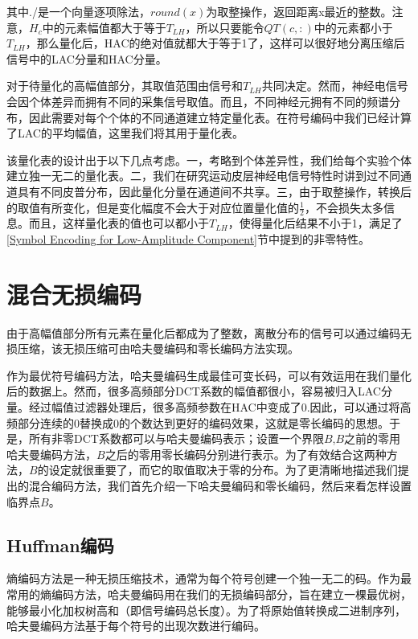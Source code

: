 其中./是一个向量逐项除法，$round(x)$为取整操作，返回距离x最近的整数。注意，$H_c$中的元素幅值都大于等于$T_{LH}$，所以只要能令$ QT(c,:)$中的元素都小于$T_{LH}$，那么量化后，HAC的绝对值就都大于等于1了，这样可以很好地分离压缩后信号中的LAC分量和HAC分量。

对于待量化的高幅值部分，其取值范围由信号和$T_{LH}$共同决定。然而，神经电信号会因个体差异而拥有不同的采集信号取值\cite{33}。而且，不同神经元拥有不同的频谱分布，因此需要对每个个体的不同通道建立特定量化表。在符号编码中我们已经计算了LAC的平均幅值，这里我们将其用于量化表。

该量化表的设计出于以下几点考虑。一，考略到个体差异性，我们给每个实验个体建立独一无二的量化表。二，我们在研究运动皮层神经电信号特性时讲到过不同通道具有不同皮普分布，因此量化分量在通道间不共享。三，由于取整操作，转换后的取值有所变化，但是变化幅度不会大于对应位置量化值的$\frac{1}{2}$，不会损失太多信息。而且，这样量化表的值也可以都小于$T_{LH}$，使得量化后结果不小于1，满足了\ref{Symbol Encoding for Low-Amplitude Component}节中提到的非零特性。



\section{混合无损编码}
由于高幅值部分所有元素在量化后都成为了整数，离散分布的信号可以通过编码无损压缩，该无损压缩可由哈夫曼编码和零长编码方法实现。

作为最优符号编码方法，哈夫曼编码生成最佳可变长码，可以有效运用在我们量化后的数据上。然而，很多高频部分DCT系数的幅值都很小，容易被归入LAC分量。经过幅值过滤器处理后，很多高频参数在HAC中变成了0.因此，可以通过将高频部分连续的0替换成0的个数达到更好的编码效果，这就是零长编码的思想。于是，所有非零DCT系数都可以与哈夫曼编码表示；设置一个界限$B$,$B$之前的零用哈夫曼编码方法，$B$之后的零用零长编码分别进行表示。为了有效结合这两种方法，$B$的设定就很重要了，而它的取值取决于零的分布。为了更清晰地描述我们提出的混合编码方法，我们首先介绍一下哈夫曼编码和零长编码，然后来看怎样设置临界点$B$。


\subsection{Huffman编码}
熵编码方法是一种无损压缩技术，通常为每个符号创建一个独一无二的码。作为最常用的熵编码方法，哈夫曼编码\cite{22}用在我们的无损编码部分，旨在建立一棵最优树，能够最小化加权树高和（即信号编码总长度）\cite{21}。为了将原始值转换成二进制序列，哈夫曼编码方法基于每个符号的出现次数进行编码。

